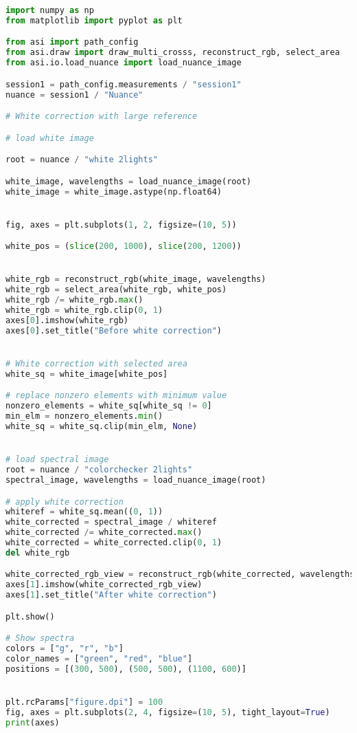 \begin{lstlisting}[language=python, caption=White correction for Nuance Cmaera with large reference, label={code:wc-nuance-large}]
import numpy as np
from matplotlib import pyplot as plt

from asi import path_config
from asi.draw import draw_multi_crosss, reconstruct_rgb, select_area
from asi.io.load_nuance import load_nuance_image

session1 = path_config.measurements / "session1"
nuance = session1 / "Nuance"

# White correction with large reference

# load white image

root = nuance / "white 2lights"

white_image, wavelengths = load_nuance_image(root)
white_image = white_image.astype(np.float64)


fig, axes = plt.subplots(1, 2, figsize=(10, 5))

white_pos = (slice(200, 1000), slice(200, 1200))


white_rgb = reconstruct_rgb(white_image, wavelengths)
white_rgb = select_area(white_rgb, white_pos)
white_rgb /= white_rgb.max()
white_rgb = white_rgb.clip(0, 1)
axes[0].imshow(white_rgb)
axes[0].set_title("Before white correction")


# White correction with selected area
white_sq = white_image[white_pos]

# replace nonzero elements with minimum value
nonzero_elements = white_sq[white_sq != 0]
min_elm = nonzero_elements.min()
white_sq = white_sq.clip(min_elm, None)


# load spectral image
root = nuance / "colorchecker 2lights"
spectral_image, wavelengths = load_nuance_image(root)

# apply white correction
whiteref = white_sq.mean((0, 1))
white_corrected = spectral_image / whiteref
white_corrected /= white_corrected.max()
white_corrected = white_corrected.clip(0, 1)
del white_rgb

white_corrected_rgb_view = reconstruct_rgb(white_corrected, wavelengths)
axes[1].imshow(white_corrected_rgb_view)
axes[1].set_title("After white correction")

plt.show()

# Show spectra
colors = ["g", "r", "b"]
color_names = ["green", "red", "blue"]
positions = [(300, 500), (500, 500), (1100, 600)]


plt.rcParams["figure.dpi"] = 100
fig, axes = plt.subplots(2, 4, figsize=(10, 5), tight_layout=True)
print(axes)


\end{lstlisting}
